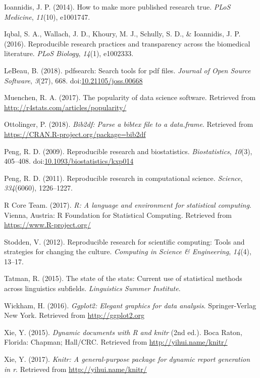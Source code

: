 \documentclass[english,,man]{apa6}
\theoremstyle{definition}
\theoremstyle{definition}
\theoremstyle{definition}
\theoremstyle{remark}
\begin{document}
\leavevmode\hypertarget{ref-ioannidis2014}{}%
Ioannidis, J. P. (2014). How to make more published research true.
\emph{PLoS Medicine}, \emph{11}(10), e1001747.

\leavevmode\hypertarget{ref-iqbal2016}{}%
Iqbal, S. A., Wallach, J. D., Khoury, M. J., Schully, S. D., \&
Ioannidis, J. P. (2016). Reproducible research practices and
transparency across the biomedical literature. \emph{PLoS Biology},
\emph{14}(1), e1002333.

\leavevmode\hypertarget{ref-pdfsearch}{}%
LeBeau, B. (2018). pdfsearch: Search tools for pdf files. \emph{Journal
of Open Source Software}, \emph{3}(27), 668.
doi:\href{https://doi.org/10.21105/joss.00668}{10.21105/joss.00668}

\leavevmode\hypertarget{ref-muenchen}{}%
Muenchen, R. A. (2017). The popularity of data science software.
Retrieved from \url{http://r4stats.com/articles/popularity/}

\leavevmode\hypertarget{ref-bib2df}{}%
Ottolinger, P. (2018). \emph{Bib2df: Parse a bibtex file to a
data.frame}. Retrieved from
\url{https://CRAN.R-project.org/package=bib2df}

\leavevmode\hypertarget{ref-peng2009}{}%
Peng, R. D. (2009). Reproducible research and biostatistics.
\emph{Biostatistics}, \emph{10}(3), 405--408.
doi:\href{https://doi.org/10.1093/biostatistics/kxp014}{10.1093/biostatistics/kxp014}

\leavevmode\hypertarget{ref-peng2011}{}%
Peng, R. D. (2011). Reproducible research in computational science.
\emph{Science}, \emph{334}(6060), 1226--1227.

\leavevmode\hypertarget{ref-rpro}{}%
R Core Team. (2017). \emph{R: A language and environment for statistical
computing}. Vienna, Austria: R Foundation for Statistical Computing.
Retrieved from \url{https://www.R-project.org/}

\leavevmode\hypertarget{ref-stodden2012}{}%
Stodden, V. (2012). Reproducible research for scientific computing:
Tools and strategies for changing the culture. \emph{Computing in
Science \& Engineering}, \emph{14}(4), 13--17.

\leavevmode\hypertarget{ref-tatman2015}{}%
Tatman, R. (2015). The state of the stats: Current use of statistical
methods across linguistics subfields. \emph{Linguistics Summer
Institute}.

\leavevmode\hypertarget{ref-ggplot2}{}%
Wickham, H. (2016). \emph{Ggplot2: Elegant graphics for data analysis}.
Springer-Verlag New York. Retrieved from \url{http://ggplot2.org}

\leavevmode\hypertarget{ref-knitr}{}%
Xie, Y. (2015). \emph{Dynamic documents with R and knitr} (2nd ed.).
Boca Raton, Florida: Chapman; Hall/CRC. Retrieved from
\url{http://yihui.name/knitr/}

\leavevmode\hypertarget{ref-knitrmanual}{}%
Xie, Y. (2017). \emph{Knitr: A general-purpose package for dynamic
report generation in r}. Retrieved from \url{http://yihui.name/knitr/}
\end{document}
